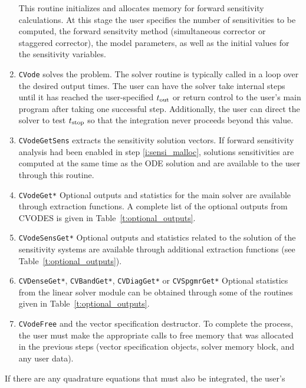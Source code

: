 \begin{enumerate}
  This routine initializes and allocates memory for forward sensitivity calculations.
  At this stage the user specifies the number of sensitivities to be computed, 
  the forward sensitvity method (simultaneous corrector or staggered corrector), 
  the model parameters, as well as the initial values for the sensitivity variables.
\item \label{i:solve}
  {\tt CVode} 
  solves the problem. 
  The solver routine is typically called in a loop over the desired output times.
  The user can have the solver take internal steps until it has reached the
  user-specified $t_{\mbox{\scriptsize out}}$ or return control to the user's
  main program after taking one successful step. Additionally, the user can
  direct the solver to test $t_{\mbox{\scriptsize stop}}$ so that the
  integration never proceeds beyond this value.
\item \label{i:getsensi}
  {\tt CVodeGetSens}
  extracts the sensitivity solution vectors. If forward sensitivity analysis
  had been enabled in step \ref{i:sensi_malloc}, solutions sensitivities are
  computed at the same time as the ODE solution and are available to the user
  through this routine.
\item \label{i:get}
  {\tt CVodeGet*} 
  Optional outputs and statistics for the main solver are available through 
  extraction functions. A complete list of the optional outputs from CVODES 
  is given in Table~\ref{t:optional_outputs}.
\item \label{i:sensi_get}
  {\tt CVodeSensGet*}
  Optional outputs and statistics related to the solution of the sensitivity 
  systems are available through additional extraction functions 
  (see Table~\ref{t:optional_outputs}).
\item \label{i:ls_get}  
  {\tt CVDenseGet*}, {\tt CVBandGet*}, {\tt CVDiagGet*} or {\tt CVSpgmrGet*}
  Optional statistics from the linear solver module can be obtained through
  some of the routines given in Table~\ref{t:optional_outputs}.
\item \label{i:free}
  {\tt CVodeFree} and the vector specification destructor.
  To complete the process, the user must make the appropriate calls to
  free memory that was allocated in the previous steps 
  (vector specification objects, solver memory block, and any user data).
\end{enumerate}
%
%
If there are any quadrature equations that must also be integrated, the user's 

